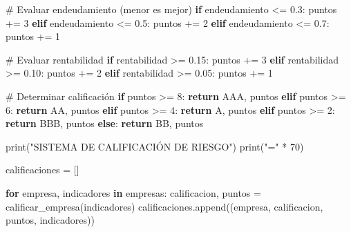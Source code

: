 \documentclass[
  doc,
  floatsintext,
  longtable,
  a4paper,
  nolmodern,
  notxfonts,
  notimes,
  12pt,
  colorlinks=true,linkcolor=blue,citecolor=blue,urlcolor=blue]{apa7}
\newenvironment{Shaded}{\begin{snugshade}}{\end{snugshade}}
\newcommand{\BuiltInTok}[1]{\textcolor[rgb]{0.00,0.23,0.31}{#1}}
\newcommand{\CommentTok}[1]{\textcolor[rgb]{0.37,0.37,0.37}{#1}}
\newcommand{\ControlFlowTok}[1]{\textcolor[rgb]{0.00,0.23,0.31}{\textbf{#1}}}
\newcommand{\DecValTok}[1]{\textcolor[rgb]{0.68,0.00,0.00}{#1}}
\newcommand{\FloatTok}[1]{\textcolor[rgb]{0.68,0.00,0.00}{#1}}
\newcommand{\KeywordTok}[1]{\textcolor[rgb]{0.00,0.23,0.31}{\textbf{#1}}}
\newcommand{\NormalTok}[1]{\textcolor[rgb]{0.00,0.23,0.31}{#1}}
\newcommand{\OperatorTok}[1]{\textcolor[rgb]{0.37,0.37,0.37}{#1}}
\newcommand{\StringTok}[1]{\textcolor[rgb]{0.13,0.47,0.30}{#1}}
\begin{document}
\begin{Shaded}
\begin{Highlighting}[]
    \CommentTok{\# Evaluar endeudamiento (menor es mejor)}
    \ControlFlowTok{if}\NormalTok{ endeudamiento }\OperatorTok{\textless{}=} \FloatTok{0.3}\NormalTok{:}
\NormalTok{        puntos }\OperatorTok{+=} \DecValTok{3}
    \ControlFlowTok{elif}\NormalTok{ endeudamiento }\OperatorTok{\textless{}=} \FloatTok{0.5}\NormalTok{:}
\NormalTok{        puntos }\OperatorTok{+=} \DecValTok{2}
    \ControlFlowTok{elif}\NormalTok{ endeudamiento }\OperatorTok{\textless{}=} \FloatTok{0.7}\NormalTok{:}
\NormalTok{        puntos }\OperatorTok{+=} \DecValTok{1}
    
    \CommentTok{\# Evaluar rentabilidad}
    \ControlFlowTok{if}\NormalTok{ rentabilidad }\OperatorTok{\textgreater{}=} \FloatTok{0.15}\NormalTok{:}
\NormalTok{        puntos }\OperatorTok{+=} \DecValTok{3}
    \ControlFlowTok{elif}\NormalTok{ rentabilidad }\OperatorTok{\textgreater{}=} \FloatTok{0.10}\NormalTok{:}
\NormalTok{        puntos }\OperatorTok{+=} \DecValTok{2}
    \ControlFlowTok{elif}\NormalTok{ rentabilidad }\OperatorTok{\textgreater{}=} \FloatTok{0.05}\NormalTok{:}
\NormalTok{        puntos }\OperatorTok{+=} \DecValTok{1}
    
    \CommentTok{\# Determinar calificación}
    \ControlFlowTok{if}\NormalTok{ puntos }\OperatorTok{\textgreater{}=} \DecValTok{8}\NormalTok{:}
        \ControlFlowTok{return} \StringTok{\textquotesingle{}AAA\textquotesingle{}}\NormalTok{, puntos}
    \ControlFlowTok{elif}\NormalTok{ puntos }\OperatorTok{\textgreater{}=} \DecValTok{6}\NormalTok{:}
        \ControlFlowTok{return} \StringTok{\textquotesingle{}AA\textquotesingle{}}\NormalTok{, puntos}
    \ControlFlowTok{elif}\NormalTok{ puntos }\OperatorTok{\textgreater{}=} \DecValTok{4}\NormalTok{:}
        \ControlFlowTok{return} \StringTok{\textquotesingle{}A\textquotesingle{}}\NormalTok{, puntos}
    \ControlFlowTok{elif}\NormalTok{ puntos }\OperatorTok{\textgreater{}=} \DecValTok{2}\NormalTok{:}
        \ControlFlowTok{return} \StringTok{\textquotesingle{}BBB\textquotesingle{}}\NormalTok{, puntos}
    \ControlFlowTok{else}\NormalTok{:}
        \ControlFlowTok{return} \StringTok{\textquotesingle{}BB\textquotesingle{}}\NormalTok{, puntos}

\BuiltInTok{print}\NormalTok{(}\StringTok{"SISTEMA DE CALIFICACIÓN DE RIESGO"}\NormalTok{)}
\BuiltInTok{print}\NormalTok{(}\StringTok{"="} \OperatorTok{*} \DecValTok{70}\NormalTok{)}

\NormalTok{calificaciones }\OperatorTok{=}\NormalTok{ []}

\ControlFlowTok{for}\NormalTok{ empresa, indicadores }\KeywordTok{in}\NormalTok{ empresas:}
\NormalTok{    calificacion, puntos }\OperatorTok{=}\NormalTok{ calificar\_empresa(indicadores)}
\NormalTok{    calificaciones.append((empresa, calificacion, puntos, indicadores))}
    

\end{Highlighting}
\end{Shaded}
\end{document}
